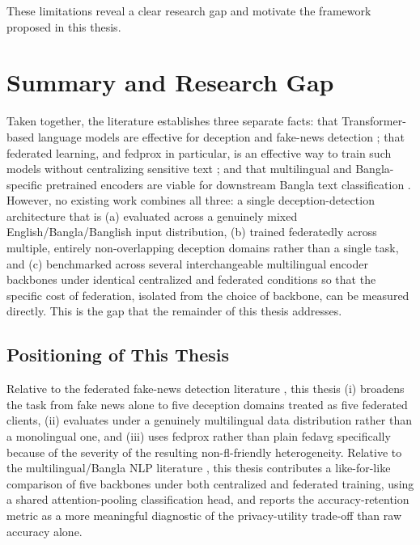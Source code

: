 These limitations reveal a clear research gap and motivate the framework
proposed in this thesis.


\section{Summary and Research Gap}

Taken together, the literature establishes three separate facts: that Transformer-based language models are effective for deception and fake-news detection \cite{fornaciari2021bertective, ilias2022explainable, alqadi2025transfer}; that federated learning, and \gls{fedprox} in particular, is an effective way to train such models without centralizing sensitive text \cite{mcmahan2017communication, li2020federated, lian2024find, djenouri2024federated}; and that multilingual and Bangla-specific pretrained encoders are viable for downstream Bangla text classification \cite{abdal2023transformer, khanuja2021muril, bhattacharjee2022banglabert}. However, no existing work combines all three: a single deception-detection architecture that is (a) evaluated across a genuinely mixed English/Bangla/Banglish input distribution, (b) trained federatedly across multiple, entirely non-overlapping deception domains rather than a single task, and (c) benchmarked across several interchangeable multilingual encoder backbones under identical centralized and federated conditions so that the specific cost of federation, isolated from the choice of backbone, can be measured directly. This is the gap that the remainder of this thesis addresses.

\subsection{Positioning of This Thesis}

Relative to the federated fake-news detection literature \cite{djenouri2024federated, lian2024find, marulli2021exploring}, this thesis (i) broadens the task from fake news alone to five deception domains treated as five federated clients, (ii) evaluates under a genuinely multilingual data distribution rather than a monolingual one, and (iii) uses \gls{fedprox} rather than plain \gls{fedavg} specifically because of the severity of the resulting non-\gls{fl}-friendly heterogeneity. Relative to the multilingual/Bangla NLP literature \cite{khanuja2021muril, bhattacharjee2022banglabert, abdal2023transformer}, this thesis contributes a like-for-like comparison of five backbones under both centralized and federated training, using a shared attention-pooling classification head, and reports the accuracy-retention metric as a more meaningful diagnostic of the privacy-utility trade-off than raw accuracy alone.
